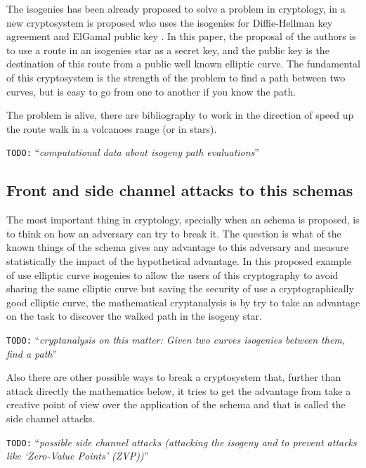 \documentclass[10pt,a4paper,twoside]{llncs}
\newcommand{\todo}[1]{\texttt{\color{red}TODO:} ``\emph{#1}''}
\begin{document}
The isogenies has been already proposed to solve a problem in cryptology, in \cite{Rostovtsev06public} a new cryptosystem is proposed who uses the isogenies for Diffie-Hellman key agreement \cite{Diffie76newdirectilons} and ElGamal public key \cite{ElGamal85pkdlp}. In this paper, the proposal of the authors is to use a route in an isogenies star as a secret key, and the public key is the destination of this route from a public well known elliptic curve. The fundamental of this cryptosystem is the strength of the problem to find a path between two curves, but is easy to go from one to another if you know the path.

The problem is alive, there are bibliography \cite{SubExpIso} to work in the direction of speed up the route walk in a volcanoes range (or in stars). 

\todo{computational data about isogeny path evaluations}

\subsection{Front and side channel attacks to this schemas \label{sec:cryptanalysis}}

The most important thing in cryptology, specially when an schema is proposed, is to think on how an adversary can try to break it. The question is what of the known things of the schema gives any advantage to this adversary and measure statistically the impact of the hypothetical advantage. In this proposed example of use elliptic curve isogenies to allow the users of this cryptography to avoid sharing the same elliptic curve but saving the security of use a cryptographically good elliptic curve, the mathematical cryptanalysis is by try to take an advantage on the task to discover the walked path in the isogeny star.

\todo{cryptanalysis on this matter: Given two curves isogenies between them, find a path}\cite{FastBetweenIso}

Also there are other possible ways to break a cryptosystem that, further than attack directly the mathematics below, it tries to get the advantage from take a creative point of view over the application of the schema and that is called the side channel attacks.

\todo{possible side channel attacks (attacking the isogeny and to prevent attacks like `\emph{Zero-Value Points}' (ZVP))}
\end{document}
